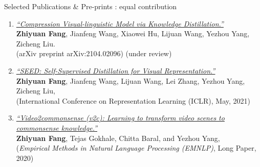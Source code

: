 \documentclass{resume} %
\begin{document}
\begin{rSection}{Selected Publications \& Pre-prints} 
{\small *: equal contribution} 
\begin{enumerate}
    \item\href{https://arxiv.org/abs/2104.02096}{\textit{``Compression Visual-linguistic Model via Knowledge Distillation.''}}{\\ \textbf{Zhiyuan Fang}, Jianfeng Wang, Xiaowei Hu, Lijuan Wang, Yezhou Yang, Zicheng Liu.\\ (arXiv preprint arXiv:2104.02096) (under review)}
    
    
        
    
    \item \href{https://arxiv.org/abs/2101.04731}{\textit{``SEED: Self-Supervised Distillation for Visual Representation.''}}{\\\textbf{{Zhiyuan Fang}}, Jianfeng Wang, Lijuan Wang, Lei Zhang, Yezhou Yang, Zicheng Liu,\\(International Conference on Representation Learning (ICLR), May, 2021)}
    
    
    \item \href{https://arxiv.org/pdf/2003.05162.pdf}{\textit{``Video2commonsense (v2c): Learning to transform video scenes to commonsense knowledge.''}}{\\\textbf{{Zhiyuan Fang}}, {Tejas Gokhale}, Chitta Baral, and Yezhou Yang, \\({\textit{Empirical Methods in Natural Language Processing (EMNLP)}}, Long Paper, 2020)}
    

\end{enumerate}
\end{rSection}
\end{document}
